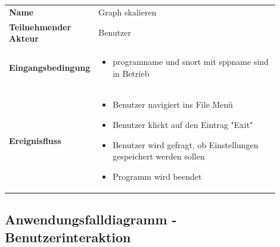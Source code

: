 \begin{tabular}{lp{0.9\linewidth}}
\textbf{Name} & Graph skalieren \\

\textbf{Teilnehmender Akteur} & Benutzer \\

\textbf{Eingangsbedingung} &
				\begin{minipage}[t]{\linewidth}
				\begin{itemize}[nosep,after=\strut,leftmargin=10pt]

				\item \gls{programname} und \gls{snort} mit \gls{sppname} sind in Betrieb

				\end{itemize}
				\end{minipage} \\
\textbf{Ereignisfluss} &
				\begin{minipage}[t]{\linewidth}
				\begin{itemize}[nosep,after=\strut,leftmargin=10pt]
				\item Benutzer navigiert ins File Menü
				\item Benutzer klickt auf den Eintrag "Exit"
				\item Benutzer wird gefragt, ob Einstellungen gespeichert werden sollen
				\item Programm wird beendet
				\end{itemize}
				\end{minipage} \\
\end{tabular}

\pagebreak

\subsection*{Anwendungsfalldiagramm - Benutzerinteraktion}

